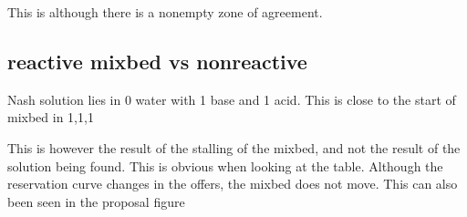 This is although there is a nonempty zone of agreement.

\subsection{reactive mixbed vs nonreactive}
Nash solution lies in 0 water with 1 base and 1 acid. This is close to the start of mixbed in 1,1,1

This is however the result of the stalling of the mixbed, and not the result of the solution being found. This is obvious when looking at the table. Although the reservation curve changes in the offers, the mixbed does not move. This can also been seen in the proposal figure

